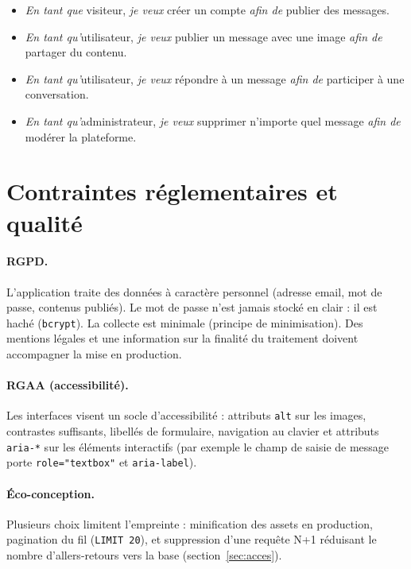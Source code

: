 \begin{itemize}
  \item \emph{En tant que} visiteur, \emph{je veux} créer un compte \emph{afin de} publier des
        messages.
  \item \emph{En tant qu'}utilisateur, \emph{je veux} publier un message avec une image
        \emph{afin de} partager du contenu.
  \item \emph{En tant qu'}utilisateur, \emph{je veux} répondre à un message \emph{afin de}
        participer à une conversation.
  \item \emph{En tant qu'}administrateur, \emph{je veux} supprimer n'importe quel message
        \emph{afin de} modérer la plateforme.
\end{itemize}

\section{Contraintes réglementaires et qualité}

\paragraph{RGPD.} L'application traite des données à caractère personnel (adresse email, mot de
passe, contenus publiés). Le mot de passe n'est jamais stocké en clair : il est haché
(\texttt{bcrypt}). La collecte est minimale (principe de minimisation). Des mentions légales et
une information sur la finalité du traitement doivent accompagner la mise en production.

\paragraph{RGAA (accessibilité).} Les interfaces visent un socle d'accessibilité : attributs
\texttt{alt} sur les images, contrastes suffisants, libellés de formulaire, navigation au
clavier et attributs \texttt{aria-*} sur les éléments interactifs (par exemple le champ de
saisie de message porte \texttt{role="textbox"} et \texttt{aria-label}).

\paragraph{Éco-conception.} Plusieurs choix limitent l'empreinte : minification des assets en
production, pagination du fil (\texttt{LIMIT 20}), et suppression d'une requête N+1 réduisant le
nombre d'allers-retours vers la base (section~\ref{sec:acces}).

